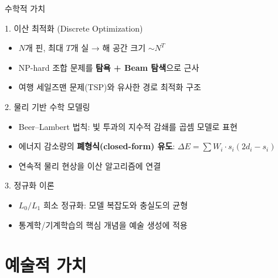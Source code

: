 \documentclass[10pt,aspectratio=169]{beamer}
\begin{document}
\begin{frame}{수학적 가치}
  \begin{block}{1. 이산 최적화 (Discrete Optimization)}
    \begin{itemize}
      \item $N$개 핀, 최대 $T$개 실 → 해 공간 크기 $\sim N^T$
      \item NP-hard 조합 문제를 \textbf{탐욕 + Beam 탐색}으로 근사
      \item 여행 세일즈맨 문제(TSP)와 유사한 경로 최적화 구조
    \end{itemize}
  \end{block}

  \begin{block}{2. 물리 기반 수학 모델링}
    \begin{itemize}
      \item Beer--Lambert 법칙: 빛 투과의 지수적 감쇄를 곱셈 모델로 표현
      \item 에너지 감소량의 \textbf{폐형식(closed-form) 유도}:
            $\Delta E = \sum W_i \cdot s_i(2d_i - s_i)$
      \item 연속적 물리 현상을 이산 알고리즘에 연결
    \end{itemize}
  \end{block}

  \begin{block}{3. 정규화 이론}
    \begin{itemize}
      \item $L_0/L_1$ 희소 정규화: 모델 복잡도와 충실도의 균형
      \item 통계학/기계학습의 핵심 개념을 예술 생성에 적용
    \end{itemize}
  \end{block}
\end{frame}

\section{예술적 가치}
\end{document}
